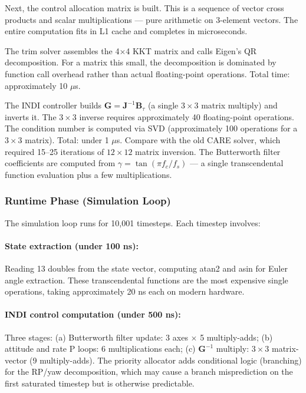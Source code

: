\documentclass[12pt, a4paper]{article}
\newcommand{\bJ}{\bm{J}}
\newcommand{\bB}{\bm{B}}
\begin{document}
Next, the control allocation matrix is built.  This is a sequence of vector cross products and scalar multiplications --- pure arithmetic on 3-element vectors.  The entire computation fits in L1 cache and completes in microseconds.

The trim solver assembles the 4$\times$4 KKT matrix and calls Eigen's QR decomposition.  For a matrix this small, the decomposition is dominated by function call overhead rather than actual floating-point operations.  Total time: approximately 10 $\mu$s.

The INDI controller builds $\bm{G} = \bJ^{-1}\bB_\tau$ (a single $3 \times 3$ matrix multiply) and inverts it.  The $3 \times 3$ inverse requires approximately 40 floating-point operations.  The condition number is computed via SVD (approximately 100 operations for a $3 \times 3$ matrix).  Total: under 1 $\mu$s.  Compare with the old CARE solver, which required 15--25 iterations of $12 \times 12$ matrix inversion.  The Butterworth filter coefficients are computed from $\gamma = \tan(\pi f_c / f_s)$ --- a single transcendental function evaluation plus a few multiplications.

\subsubsection{Runtime Phase (Simulation Loop)}

The simulation loop runs for 10{,}001 timesteps.  Each timestep involves:

\paragraph{State extraction (under 100 ns):}  Reading 13 doubles from the state vector, computing atan2 and asin for Euler angle extraction.  These transcendental functions are the most expensive single operations, taking approximately 20 ns each on modern hardware.

\paragraph{INDI control computation (under 500 ns):}  Three stages: (a) Butterworth filter update: 3 axes $\times$ 5 multiply-adds; (b) attitude and rate P loops: 6 multiplications each; (c) $\bm{G}^{-1}$ multiply: $3 \times 3$ matrix-vector (9 multiply-adds).  The priority allocator adds conditional logic (branching) for the RP/yaw decomposition, which may cause a branch misprediction on the first saturated timestep but is otherwise predictable.
\end{document}
